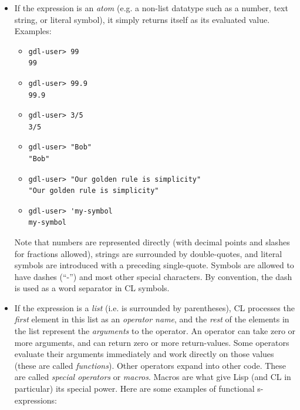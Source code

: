 \documentclass [11pt]{book}
\begin{document}
\begin{itemize}

\item If the expression is an \emph{atom} (e.g. a non-list datatype such as a number, text
string, or literal symbol), it simply returns itself as its evaluated
value. Examples: 

\begin{itemize}

\item 

\begin{verbatim}gdl-user> 99
99
\end{verbatim}

\item 

\begin{verbatim}gdl-user> 99.9
99.9
\end{verbatim}

\item 

\begin{verbatim}gdl-user> 3/5
3/5
\end{verbatim}

\item 

\begin{verbatim}gdl-user> "Bob"
"Bob"
\end{verbatim}

\item 

\begin{verbatim}gdl-user> "Our golden rule is simplicity"
"Our golden rule is simplicity"
\end{verbatim}

\item 

\begin{verbatim}gdl-user> 'my-symbol
my-symbol
\end{verbatim}

\end{itemize}

Note that numbers are represented directly (with decimal
points and slashes for fractions allowed), strings are surrounded by
double-quotes, and literal symbols are introduced with a preceding
single-quote. Symbols are allowed to have dashes (``-'') and most
other special characters. By convention, the dash is used as a word
separator in CL symbols.

\item If the expression is a \emph{list} (i.e. is surrounded by parentheses), CL processes
the \emph{first} element in this list as an \emph{operator name}, and the \emph{rest} of the elements in the list represent the \emph{arguments} to the operator. An operator can take zero or more
arguments, and can return zero or more return-values. Some operators
evaluate their arguments immediately and work directly on those
values (these are called \emph{functions}). Other operators expand into other code. These are called \emph{special operators} or \emph{macros}. Macros are what give Lisp (and CL in particular) its
special power. Here are some examples of functional s-expressions: 


\end{itemize}
\end{document}
